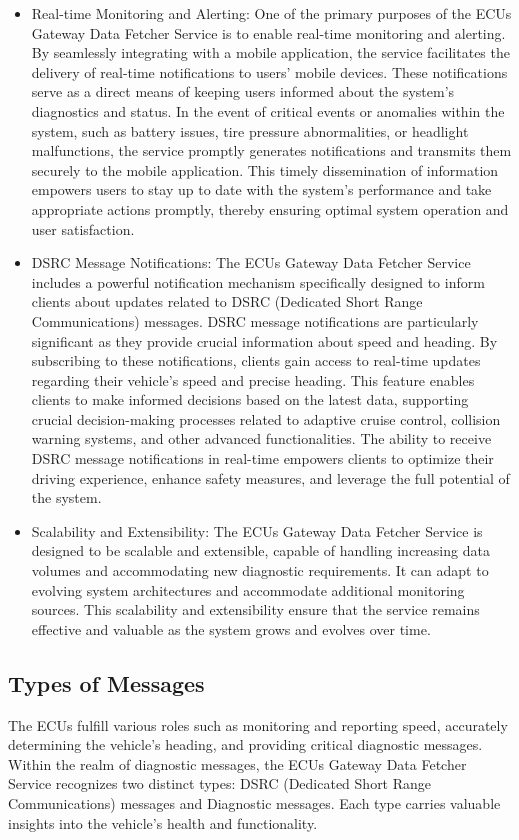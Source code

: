 \documentclass[
12pt,
oneside, 
onehalfspacing, 
nolistspacing, 
parskip, 
chapterinoneline, 
]{AASTCOMPUTER}
\begin{document}
\begin{itemize}
  \item Real-time Monitoring and Alerting: One of the primary purposes of the ECUs Gateway Data Fetcher Service is to enable real-time monitoring and alerting. By seamlessly integrating with a mobile application, the service facilitates the delivery of real-time notifications to users' mobile devices. These notifications serve as a direct means of keeping users informed about the system's diagnostics and status. In the event of critical events or anomalies within the system, such as battery issues, tire pressure abnormalities, or headlight malfunctions, the service promptly generates notifications and transmits them securely to the mobile application. This timely dissemination of information empowers users to stay up to date with the system's performance and take appropriate actions promptly, thereby ensuring optimal system operation and user satisfaction.
  
  \item DSRC Message Notifications: The ECUs Gateway Data Fetcher Service includes a powerful notification mechanism specifically designed to inform clients about updates related to DSRC (Dedicated Short Range Communications) messages. DSRC message notifications are particularly significant as they provide crucial information about speed and heading. By subscribing to these notifications, clients gain access to real-time updates regarding their vehicle's speed and precise heading. This feature enables clients to make informed decisions based on the latest data, supporting crucial decision-making processes related to adaptive cruise control, collision warning systems, and other advanced functionalities. The ability to receive DSRC message notifications in real-time empowers clients to optimize their driving experience, enhance safety measures, and leverage the full potential of the system.
  
  \item Scalability and Extensibility: The ECUs Gateway Data Fetcher Service is designed to be scalable and extensible, capable of handling increasing data volumes and accommodating new diagnostic requirements. It can adapt to evolving system architectures and accommodate additional monitoring sources. This scalability and extensibility ensure that the service remains effective and valuable as the system grows and evolves over time.
\end{itemize}

\subsection{Types of Messages}
The ECUs fulfill various roles such as monitoring and reporting speed, accurately determining the vehicle's heading, and providing critical diagnostic messages. Within the realm of diagnostic messages, the ECUs Gateway Data Fetcher Service recognizes two distinct types: DSRC (Dedicated Short Range Communications) messages and Diagnostic messages. Each type carries valuable insights into the vehicle's health and functionality.
\end{document}
